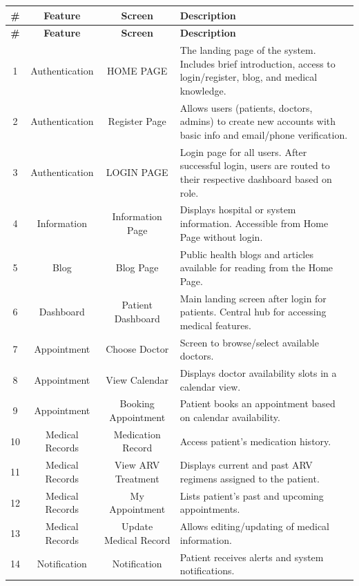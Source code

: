 \documentclass[12pt,a4paper]{article}
\begin{document}
\renewcommand{\arraystretch}{1.4}
\begin{longtable}{|c|c|c|p{8.5cm}|}
\hline
\textbf{\#} & \textbf{Feature} & \textbf{Screen} & \textbf{Description} \\
\hline
\endfirsthead

\hline
\textbf{\#} & \textbf{Feature} & \textbf{Screen} & \textbf{Description} \\
\hline
\endhead

1 & Authentication & HOME PAGE & The landing page of the system. Includes brief introduction, access to login/register, blog, and medical knowledge. \\
\hline
2 & Authentication & Register Page & Allows users (patients, doctors, admins) to create new accounts with basic info and email/phone verification. \\
\hline
3 & Authentication & LOGIN PAGE & Login page for all users. After successful login, users are routed to their respective dashboard based on role. \\
\hline
4 & Information & Information Page & Displays hospital or system information. Accessible from Home Page without login. \\
\hline
5 & Blog & Blog Page & Public health blogs and articles available for reading from the Home Page. \\
\hline
6 & Dashboard & Patient Dashboard & Main landing screen after login for patients. Central hub for accessing medical features. \\
\hline
7 & Appointment & Choose Doctor & Screen to browse/select available doctors. \\
\hline
8 & Appointment & View Calendar & Displays doctor availability slots in a calendar view. \\
\hline
9 & Appointment & Booking Appointment & Patient books an appointment based on calendar availability. \\
\hline
10 & Medical Records & Medication Record & Access patient's medication history. \\
\hline
11 & Medical Records & View ARV Treatment & Displays current and past ARV regimens assigned to the patient. \\
\hline
12 & Medical Records & My Appointment & Lists patient’s past and upcoming appointments. \\
\hline
13 & Medical Records & Update Medical Record & Allows editing/updating of medical information. \\
\hline
14 & Notification & Notification & Patient receives alerts and system notifications. \\

\end{longtable}
\end{document}
